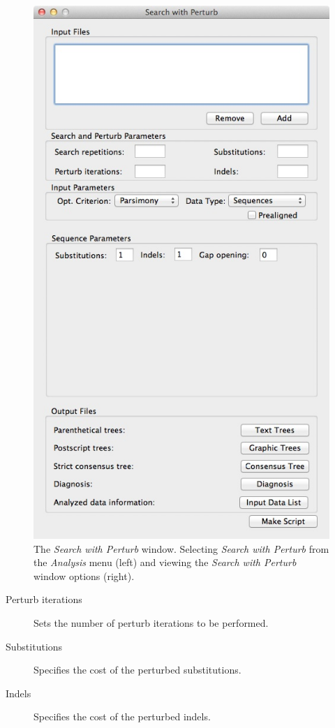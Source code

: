 {\begin{figure}
\begin{minipage}[c]{0.52\textwidth}
	   	\includegraphics[width=\textwidth]{doc/figures/searchwithperturb_window.jpg}
   	\end{minipage} 
\caption{The \emph{Search with Perturb} window. Selecting \emph{Search with Perturb} from the \emph{Analysis} menu (left) and viewing the \emph{Search with Perturb} window options (right).}
\label{fig:search_with_perturb_window}
\end{figure}

\begin{description}
    \item[Perturb iterations] Sets the number of perturb iterations to be performed.
    \item[Substitutions] Specifies the cost of the perturbed substitutions.
    \item[Indels] Specifies the cost of the perturbed indels.
\end{description}

}
